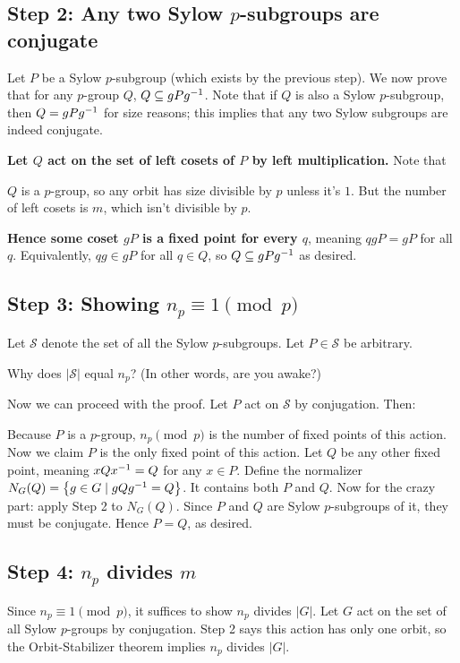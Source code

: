 \subsection*{Step 2: Any two Sylow $p$-subgroups are conjugate}
Let $P$ be a Sylow $p$-subgroup (which exists by the previous step).
We now prove that for any $p$-group $Q$, $Q \subseteq gPg^{-1}$.
Note that if $Q$ is also a Sylow $p$-subgroup, then $Q = gPg^{-1}$ for size reasons;
this implies that any two Sylow subgroups are indeed conjugate.

\textbf{Let $Q$ act on the set of left cosets of $P$ by left multiplication.}
Note that
\begin{itemize}
	\ii $Q$ is a $p$-group, so any orbit has size divisible by $p$ unless it's $1$.
	\ii But the number of left cosets is $m$, which isn't divisible by $p$.
\end{itemize}
\textbf{Hence some coset $gP$ is a fixed point for every $q$}, meaning
$qgP = gP$ for all $q$.
Equivalently, $qg \in gP$ for all $q \in Q$, so $Q \subseteq gPg^{-1}$ as desired.


\subsection*{Step 3: Showing $n_p \equiv 1 \pmod p$}
Let $\mathcal S$ denote the set of all the Sylow $p$-subgroups.
Let $P \in \mathcal S$ be arbitrary.
\begin{ques}
	Why does $\left\lvert \mathcal S \right\rvert$ equal $n_p$?
	(In other words, are you awake?)
\end{ques}
Now we can proceed with the proof.
Let $P$ act on $\mathcal S$ by conjugation.
Then:
\begin{itemize}
	\ii Because $P$ is a $p$-group, $n_p \pmod p$ is the number of fixed points
	of this action.
	Now we claim $P$ is the only fixed point of this action.
	\ii Let $Q$ be any other fixed point, meaning $xQx^{-1} = Q$ for any $x \in P$.
	\ii Define the normalizer $N_G(Q) = \left\{ g \in G \mid gQg^{-1} = Q \right\}$.  It contains both $P$ and $Q$.
	\ii Now for the crazy part: apply Step 2 to $N_G(Q)$.
	Since $P$ and $Q$ are Sylow $p$-subgroups of it, they must be conjugate.
	\ii Hence $P=Q$, as desired.
\end{itemize}

\subsection*{Step 4: $n_p$ divides $m$}
Since $n_p \equiv 1 \pmod p$, it suffices to show $n_p$ divides $\left\lvert G \right\rvert$.
Let $G$ act on the set of all Sylow $p$-groups by conjugation.
Step 2 says this action has only one orbit, so the Orbit-Stabilizer theorem
implies $n_p$ divides $\left\lvert G \right\rvert$.



